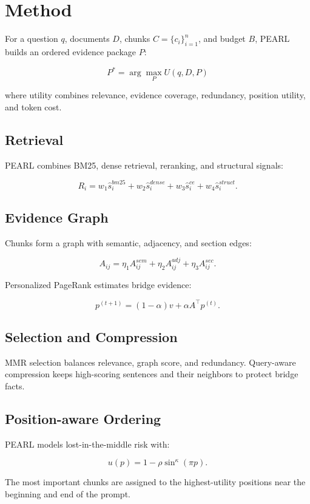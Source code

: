 \section{Method}

For a question $q$, documents $D$, chunks $C=\{c_i\}_{i=1}^{n}$, and budget $B$,
PEARL builds an ordered evidence package $P$:

\[
P^* = \arg\max_P U(q,D,P)
\]

where utility combines relevance, evidence coverage, redundancy, position
utility, and token cost.

\subsection{Retrieval}

PEARL combines BM25, dense retrieval, reranking, and structural signals:

\[
R_i =
w_1 \hat{s}^{bm25}_i
+ w_2 \hat{s}^{dense}_i
+ w_3 \hat{s}^{ce}_i
+ w_4 \hat{s}^{struct}_i.
\]

\subsection{Evidence Graph}

Chunks form a graph with semantic, adjacency, and section edges:

\[
A_{ij} =
\eta_1 A_{ij}^{sem}
+ \eta_2 A_{ij}^{adj}
+ \eta_3 A_{ij}^{sec}.
\]

Personalized PageRank estimates bridge evidence:

\[
p^{(t+1)} = (1-\alpha)v + \alpha A^\top p^{(t)}.
\]

\subsection{Selection and Compression}

MMR selection balances relevance, graph score, and redundancy. Query-aware
compression keeps high-scoring sentences and their neighbors to protect bridge
facts.

\subsection{Position-aware Ordering}

PEARL models lost-in-the-middle risk with:

\[
u(p)=1-\rho\sin^\kappa(\pi p).
\]

The most important chunks are assigned to the highest-utility positions near
the beginning and end of the prompt.
